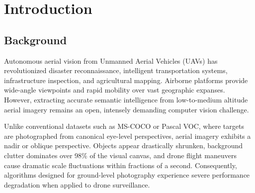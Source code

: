 \documentclass[12pt,a4paper]{report}
\begin{document}
\newpage
\tableofcontents
\newpage
{}

\chapter{Introduction}

\section{Background}
Autonomous aerial vision from Unmanned Aerial Vehicles (UAVs) has revolutionized disaster reconnaissance, intelligent transportation systems, infrastructure inspection, and agricultural mapping. Airborne platforms provide wide-angle viewpoints and rapid mobility over vast geographic expanses. However, extracting accurate semantic intelligence from low-to-medium altitude aerial imagery remains an open, intensely demanding computer vision challenge. 

Unlike conventional datasets such as MS-COCO or Pascal VOC, where targets are photographed from canonical eye-level perspectives, aerial imagery exhibits a nadir or oblique perspective. Objects appear drastically shrunken, background clutter dominates over 98\% of the visual canvas, and drone flight maneuvers cause dramatic scale fluctuations within fractions of a second. Consequently, algorithms designed for ground-level photography experience severe performance degradation when applied to drone surveillance.
\end{document}
